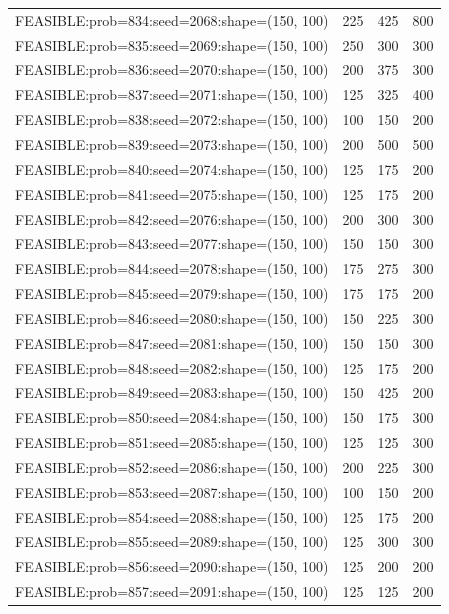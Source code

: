 \begin{longtable}{lccc}
FEASIBLE:prob=834:seed=2068:shape=(150, 100) &  225 &   425 &    800 \\
FEASIBLE:prob=835:seed=2069:shape=(150, 100) &  250 &   300 &    300 \\
FEASIBLE:prob=836:seed=2070:shape=(150, 100) &  200 &   375 &    300 \\
FEASIBLE:prob=837:seed=2071:shape=(150, 100) &  125 &   325 &    400 \\
FEASIBLE:prob=838:seed=2072:shape=(150, 100) &  100 &   150 &    200 \\
FEASIBLE:prob=839:seed=2073:shape=(150, 100) &  200 &   500 &    500 \\
FEASIBLE:prob=840:seed=2074:shape=(150, 100) &  125 &   175 &    200 \\
FEASIBLE:prob=841:seed=2075:shape=(150, 100) &  125 &   175 &    200 \\
FEASIBLE:prob=842:seed=2076:shape=(150, 100) &  200 &   300 &    300 \\
FEASIBLE:prob=843:seed=2077:shape=(150, 100) &  150 &   150 &    300 \\
FEASIBLE:prob=844:seed=2078:shape=(150, 100) &  175 &   275 &    300 \\
FEASIBLE:prob=845:seed=2079:shape=(150, 100) &  175 &   175 &    200 \\
FEASIBLE:prob=846:seed=2080:shape=(150, 100) &  150 &   225 &    300 \\
FEASIBLE:prob=847:seed=2081:shape=(150, 100) &  150 &   150 &    300 \\
FEASIBLE:prob=848:seed=2082:shape=(150, 100) &  125 &   175 &    200 \\
FEASIBLE:prob=849:seed=2083:shape=(150, 100) &  150 &   425 &    200 \\
FEASIBLE:prob=850:seed=2084:shape=(150, 100) &  150 &   175 &    300 \\
FEASIBLE:prob=851:seed=2085:shape=(150, 100) &  125 &   125 &    300 \\
FEASIBLE:prob=852:seed=2086:shape=(150, 100) &  200 &   225 &    300 \\
FEASIBLE:prob=853:seed=2087:shape=(150, 100) &  100 &   150 &    200 \\
FEASIBLE:prob=854:seed=2088:shape=(150, 100) &  125 &   175 &    200 \\
FEASIBLE:prob=855:seed=2089:shape=(150, 100) &  125 &   300 &    300 \\
FEASIBLE:prob=856:seed=2090:shape=(150, 100) &  125 &   200 &    200 \\
FEASIBLE:prob=857:seed=2091:shape=(150, 100) &  125 &   125 &    200 \\

\end{longtable}
